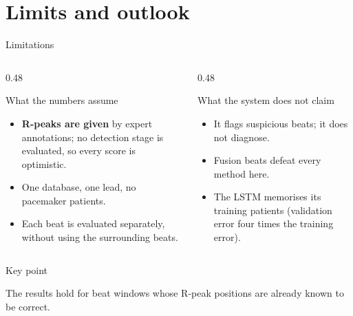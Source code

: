 \documentclass[aspectratio=169,10pt]{beamer}
\newcommand{\keypoint}[1]{%
  \vspace{0.4em}
  \begin{alertblock}{Key point}
    #1
  \end{alertblock}
}
\begin{document}
\section{Limits and outlook}


\begin{frame}{Limitations}

  \begin{columns}[T]
    \begin{column}{0.48\textwidth}
      \begin{block}{What the numbers assume}
        \begin{itemize}
          \item \textbf{R-peaks are given} by expert annotations; no detection stage is
            evaluated, so every score is optimistic.
          \item One database, one lead, no pacemaker patients.
          \item Each beat is evaluated separately, without using the surrounding beats.
        \end{itemize}
      \end{block}
    \end{column}
    \begin{column}{0.48\textwidth}
      \begin{block}{What the system does not claim}
        \begin{itemize}
          \item It flags suspicious beats; it does not diagnose.
          \item Fusion beats defeat every method here.
          \item The LSTM memorises its training patients (validation error four times
            the training error).
        \end{itemize}
      \end{block}
    \end{column}
  \end{columns}

  \keypoint{
    \vspace{0.1cm}
    The results hold for beat windows whose R-peak positions are already known
  to be correct.}

\end{frame}
\end{document}
